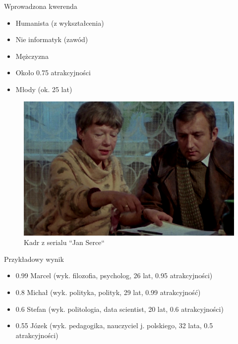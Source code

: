 \documentclass{beamer}
\begin{document}
\begin{frame}
    \begin{block}{Wprowadzona kwerenda}
		\begin{itemize}
		    \item Humanista (z wykształcenia)
		    \item Nie informatyk (zawód)
            \item Mężczyzna
            \item Około 0.75 atrakcyjności
            \item Młody (ok. 25 lat)
		\end{itemize}
	\end{block}
   
	\begin{figure}
		\centering
		\includegraphics[height=0.3\textheight,keepaspectratio]{images/biuro-kiedys.jpg}
		\caption{Kadr z serialu ``Jan Serce``}
	\end{figure}

\end{frame} 

\begin{frame}

	\begin{block}{Przykładowy wynik}
		\begin{itemize}
		    \item 0.99 Marcel (wyk. filozofia, psycholog, 26 lat, 0.95 atrakcyjności)
		    \item 0.8 Michał (wyk. polityka, polityk, 29 lat,  0.99 atrakcyjność)
            \item 0.6 Stefan (wyk. politologia, data scientist, 20 lat, 0.6 atrakcyjności)
            \item 0.55 Józek (wyk. pedagogika, nauczyciel j. polskiego, 32 lata, 0.5 atrakcyjności)
		\end{itemize}
	\end{block}

\end{frame}
\end{document}
